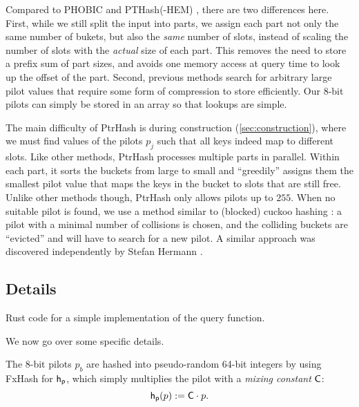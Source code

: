\documentclass[a4paper,UKenglish,cleveref,thm-restate]{lipics-v2021}
\begin{document}
Compared to PHOBIC and PTHash(-HEM) \cite{pthash-2}, there are two differences
here.
First, while we still split the input into parts, we assign each part
not only the same number of bukets, but also
the
\emph{same} number of slots, instead of scaling the number of slots with the
\emph{actual} size of each part. This removes the need to store a prefix sum of part
sizes, and avoids one memory access at query time to look up the offset of the
part.
Second, previous methods search for arbitrary large
pilot values that require some form of compression to store efficiently. Our
8-bit pilots can simply be stored in an array so that lookups are simple.

 The main difficulty of PtrHash is during construction (\cref{sec:construction}), where we must find values of the
pilots \(p_j\) such that all keys indeed map to different slots.
Like other methods, PtrHash processes multiple parts in parallel.
Within each part, it sorts the buckets from large to
small and ``greedily'' assigns them the smallest pilot value that maps the keys in
the bucket to slots that are still free.
Unlike other methods though, PtrHash only allows pilots up to \(255\). When no
suitable pilot is found, we use a method similar to (blocked) cuckoo hashing
\cite{cuckoo-hashing,dary-cuckoo-hashing}: a pilot with a minimal number of collisions is chosen,
and the colliding buckets are ``evicted'' and will have to search for a new pilot.
A similar approach was discovered independently by Stefan Hermann
\cite[Section 4.5]{phobic-thesis}.
\subsection{Details}
\label{sec:org0a4579c}

\begin{listing}[t]
  \vspace{-1.3em}%
\caption{\label{query-code}Rust code for a simple implementation of the query function.}
\end{listing}

We now go over some specific details.

The 8-bit pilots \(p_b\) are hashed into pseudo-random 64-bit integers by
using FxHash \cite{fxhash} for \(\mathsf{h}_{\mathsf{p}}\),
which simply multiplies the pilot with a \emph{mixing constant} \(\mathsf{C}\):
\begin{equation}
\mathsf{h}_{\mathsf{p}}(p) := \mathsf{C} \cdot p.
\end{equation}
\end{document}

